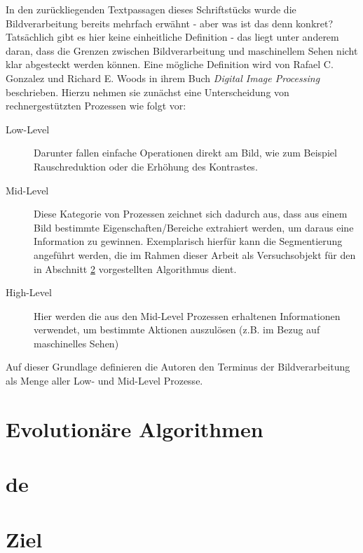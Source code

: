 \documentclass[10pt,a4paper,abstraction]{scrreprt}
\begin{document}
	In den zurückliegenden Textpassagen dieses Schriftstücks wurde die Bildverarbeitung bereits mehrfach erwähnt - aber was ist das denn konkret? Tatsächlich gibt es hier keine einheitliche Definition - das liegt unter anderem daran, dass die Grenzen zwischen Bildverarbeitung und maschinellem Sehen nicht klar abgesteckt werden können. Eine mögliche Definition wird von Rafael C. Gonzalez und Richard E. Woods in ihrem Buch \textit{Digital Image Processing} beschrieben. Hierzu nehmen sie zunächst eine Unterscheidung von rechnergestützten Prozessen wie folgt vor: \cite{gonzalez-woods-imgproc}
	\begin{description}
		\item[Low-Level] Darunter fallen einfache Operationen direkt am Bild, wie zum Beispiel Rauschreduktion oder die Erhöhung des Kontrastes.
		\item[Mid-Level] Diese Kategorie von Prozessen zeichnet sich dadurch aus, dass aus einem Bild bestimmte Eigenschaften/Bereiche extrahiert werden, um daraus eine Information zu gewinnen. Exemplarisch hierfür kann die Segmentierung angeführt werden, die im Rahmen dieser Arbeit als Versuchsobjekt für den in Abschnitt \ref{sec:de} vorgestellten Algorithmus dient.
		\item[High-Level] Hier werden die aus den Mid-Level Prozessen erhaltenen Informationen verwendet, um bestimmte Aktionen auszulösen (z.B. im Bezug auf maschinelles Sehen)
	\end{description}

	Auf dieser Grundlage definieren die Autoren den Terminus der Bildverarbeitung als Menge aller Low- und Mid-Level Prozesse. \cite{gonzalez-woods-imgproc}
	\section{Evolutionäre Algorithmen}
	\label{sec:evol}
	
	
	\section{\gls{de}}
	\label{sec:de}
	
	\section{Ziel}
	\label{sec:ziel}
	
\end{document}
